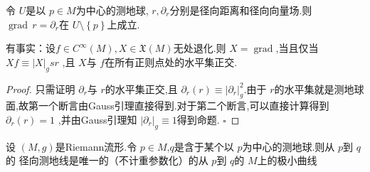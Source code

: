 \documentclass[../../几何与拓扑.tex]{subfiles}
\begin{document}
\begin{corollary}
    令 \(  U  \)是以 \(  p \in M  \)为中心的测地球, \(  r,\partial _{r}  \)分别是径向距离和径向向量场.则 \(  \operatorname{grad}\,r= \partial _{r}  \)在 \(  U\setminus \left\{ p \right\}  \)上成立.     
\end{corollary}

\begin{remark}
    有事实：设\(  f\in C^{\infty}\left( M \right),X \in \mathfrak{X}\left( M \right)    \)无处退化.则 \(  X = \operatorname{grad}  \),当且仅当 \(  Xf\equiv \left| X \right|_{g}sr   \)   ,且 \(  X  \)与 \(  f  \)在所有正则点处的水平集正交.  
\end{remark}

\begin{proof}
    只需证明 \(  \partial _{r}  \)与 \(  r  \)的水平集正交,且 \(  \partial _{r}\left( r \right)\equiv \left| \partial _{r} \right|_{g}^{2}    \).由于 \(  r  \)的水平集就是测地球面,故第一个断言由Gauss引理直接得到.对于第二个断言,可以直接计算得到 \(  \partial _{r}\left( r \right)= 1   \)   ,并由Gauss引理知 \(  \left| \partial _{r} \right|_{g}\equiv 1   \)得到命题. 
    \hfill $\square$
\end{proof}

\begin{proposition}
    设 \(  \left( M,g \right)   \)是Riemann流形.令 \(  p \in M  \),\(  q  \)是含于某个以 \(  p  \)为中心的测地球.则从 \(  p  \)到 \(  q  \)的  径向测地线是唯一的（不计重参数化）的从 \(  p  \)到 \(  q  \)的  \(  M  \)上的极小曲线      
\end{proposition}
\end{document}
